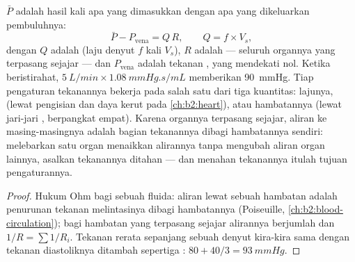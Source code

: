 \begin{theorem}\label{thm:b2:blood-pressure:equation}
 $\bar P$ adalah hasil kali apa yang dimasukkan
 dengan apa yang dikeluarkan pembuluhnya:
\[
\bar P - P_{\text{vena}} = Q\,R, \qquad Q = f\times V_s,
\]
dengan $Q$ adalah  (laju denyut $f$ kali  $V_s$), $R$ adalah  ---  seluruh
organnya yang terpasang sejajar --- dan $P_{\text{vena}}$ adalah
tekanan , yang mendekati nol. Ketika beristirahat,
$\qty{5}{L/min}\times\qty{1.08}{mmHg.s/mL}$ memberikan \qty{90}{mmHg}.
Tiap pengaturan tekanannya bekerja pada salah satu dari tiga kuantitas:
lajunya,  (lewat pengisian dan daya kerut pada
\cref{ch:b2:heart}), atau hambatannya (lewat jari-jari ,
berpangkat empat). Karena organnya terpasang sejajar, aliran ke
masing-masingnya adalah bagian tekanannya dibagi hambatannya sendiri:
melebarkan  satu organ menaikkan alirannya tanpa mengubah
aliran organ lainnya, asalkan tekanannya ditahan --- dan menahan
tekanannya itulah tujuan pengaturannya.
\end{theorem}
\begin{proof}
Hukum Ohm bagi sebuah fluida: aliran lewat sebuah hambatan adalah
penurunan tekanan melintasinya dibagi hambatannya (Poiseuille,
\cref{ch:b2:blood-circulation}); bagi hambatan yang terpasang sejajar
alirannya berjumlah dan $1/R = \sum 1/R_i$. Tekanan rerata sepanjang
sebuah denyut kira-kira sama dengan tekanan diastoliknya ditambah
sepertiga : $80 + 40/3 = \qty{93}{mmHg}$.
\end{proof}

